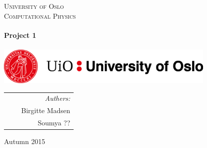 \thispagestyle{empty}

\begin{center}



\textsc{\LARGE University of Oslo}\\[0.5cm]

\textsc{\Large Computational Physics}\\[2cm]
 

\HRule \\[0.4cm]
 \LARGE \textbf{Project 1}  \\[0.2cm]
\HRule \\[2.5cm]


\includegraphics[width=0.8\textwidth]{Figures/UiO_Seal_A_ENG.png}\\  %

\vfill 
 
\begin{tabularx}{\textwidth}{l X r}
\hline
\large \phantom{Authors:} & & \large \emph{Authers:}\\
\large \phantom{Andreas Valentin Pedersen} & &\large Birgitte Madsen\\
\large \phantom{Birgitte Madsen} & & \large Soumya ?? \\
\hline

\end{tabularx}




\vfill

{\large Autumn 2015}

\end{center}
\cleardoublepage

